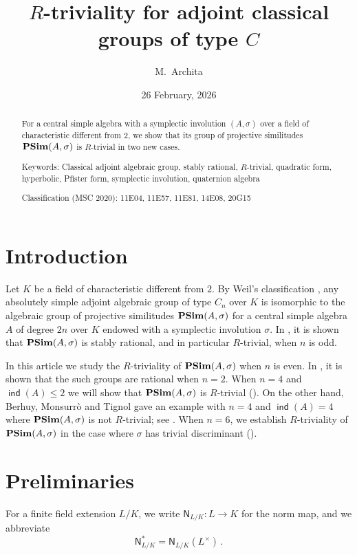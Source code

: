 \documentclass[twoside,11pt]{amsart}
\title[$R$-triviality for projective similitudes]{$R$-triviality for adjoint classical groups of type $C$}
\date{26 February, 2026}
\author{M.~Archita}
\numberwithin{equation}{section}
\theoremstyle{definition}
\newcommand\ind{\operatorname{\mathsf{ind}}}
\newcommand\N{\operatorname{N}}
\newcommand{\mg}[1]{{#1}^{\times}}
\newcommand{\s}{\sigma}
\renewcommand{\leq}{\leqslant}
\renewcommand{\N}{\mathsf{N}}
\renewcommand{\leq}{\leqslant}
\begin{document}
\maketitle

\begin{abstract}
    For a central simple algebra with a symplectic involution $(A,\s)$ over a field of characteristic different from $2$, we show that its group of projective similitudes ${\bf PSim}(A,\s)$ is $R$-trivial in two new cases.
   

\medskip\noindent
{\sc Keywords:} 
Classical adjoint  algebraic group, stably rational, $R$-trivial, quadratic form, hyperbolic, Pfister form, symplectic involution, quaternion algebra

\medskip\noindent
{\sc Classification (MSC 2020):} 11E04, %
11E57, %
11E81, %
14E08, %
20G15 %
\end{abstract}

\section{Introduction}

Let $K$ be a field of characteristic different from $2$. 
By Weil's classification \cite{Wei61}, any absolutely simple adjoint algebraic group of type $C_n$ over $K$ is isomorphic
to the algebraic group of projective similitudes ${\bf PSim}(A,\s)$ for a central simple algebra $A$ of degree $2n$ over $K$ endowed with a symplectic involution $\s$. In \cite[\S 2]{Mer96}, it is shown that ${\bf PSim}(A,\s)$ is stably rational, and in particular $R$-trivial, when $n$ is odd. 


In this article we  study the $R$-triviality of ${\bf PSim}(A,\s)$ when $n$ is even. In \cite[\S 2]{Mer96}, it is shown that the such groups are rational when $n= 2$. 
When $n=4$ and $\ind(A)\leq 2$ we will show that ${\bf PSim}(A,\s)$ is $R$-trivial (). On the other hand, Berhuy, Monsurrò and Tignol \cite[Cor.~9]{BMT04} gave an example with $n=4$ and $\ind(A)=4$ where ${\bf PSim}(A,\s)$ is not $R$-trivial; see .
When $n=6$, we establish $R$-triviality of ${\bf PSim}(A,\s)$ in the case where $\s$ has trivial discriminant ().
\section{Preliminaries}
 For a finite field extension $L/K$, we write 
$\N_{L/K}:L\to K$ for the norm map, and we abbreviate $$\N_{L/K}^\ast=\N_{L/K}(\mg{L})\,.$$
\end{document}
